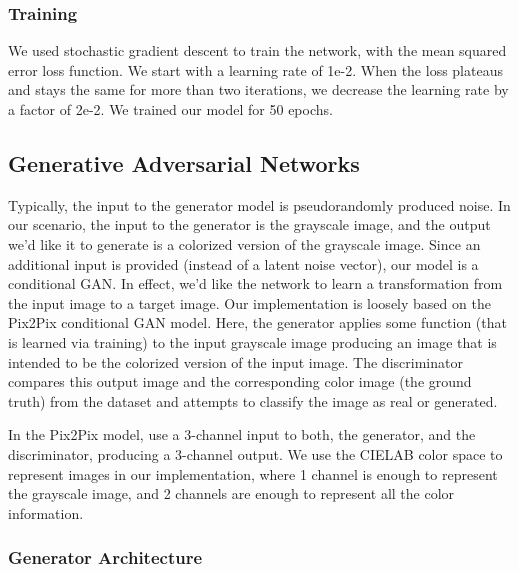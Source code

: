 \documentclass{article}
\begin{document}
\subsubsection{Training}
We used stochastic gradient descent to train the network, with the mean squared
error loss function. We start with a learning rate of 1e-2. When the loss
plateaus and stays the same for more than two iterations, we decrease the
learning rate by a factor of 2e-2. We trained our model for 50 epochs.

\subsection{Generative Adversarial Networks}

Typically, the input to the generator model is pseudorandomly produced noise. In
our scenario, the input to the generator is the grayscale image, and the output
we'd like it to generate is a colorized version of the grayscale image. Since an
additional input is provided (instead of a latent noise vector), our model is a
conditional GAN. In effect, we'd like the network to learn a transformation from
the input image to a target image. Our implementation is loosely based on the
Pix2Pix conditional GAN model. Here, the generator applies some function (that
is learned via training) to the input grayscale image producing an image that is
intended to be the colorized version of the input image. The discriminator
compares this output image and the corresponding color image (the ground truth)
from the dataset and attempts to classify the image as real or generated.

In the Pix2Pix model, \cite{DBLP:journals/corr/IsolaZZE16} use a 3-channel input
to both, the generator, and the discriminator, producing a 3-channel output. We
use the CIELAB color space to represent images in our implementation, where 1
channel is enough to represent the grayscale image, and 2 channels are enough to
represent all the color information.

\subsubsection{Generator Architecture}
\end{document}
